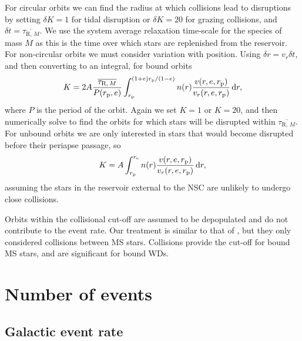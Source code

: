 For circular orbits we can find the radius at which collisions lead to disruptions by setting $\delta K = 1$ for tidal disruption or $\delta K = 20$ for grazing collisions, and $\delta t = \overline{\tau_{\mathrm{R},\,M}}$. We use the system average relaxation time-scale for the species of mass $M$ as this is the time over which stars are replenished from the reservoir. For non-circular orbits we must consider variation with position. Using $\delta r = v_r \delta t$, and then converting to an integral, for bound orbits
\begin{equation}
K = 2 A \dfrac{\overline{\tau_{\mathrm{R},\,M}}}{P(r_\mathrm{p},e)}\int_{r_\mathrm{p}}^{(1+e)r_\mathrm{p}/(1-e)}{n(r)\dfrac{v(r,e,r_\mathrm{p})}{v_r(r,e,r_\mathrm{p})}}\,\mathrm{d}{r},
\label{eq:collision-K}
\end{equation}
where $P$ is the period of the orbit. Again we set $K = 1$ or $K = 20$, and then numerically solve  to find the orbits for which stars will be disrupted within $\overline{\tau_{\mathrm{R},\,M}}$. For unbound orbits we are only interested in stars that would become disrupted before their periapse passage, so
\begin{equation}
K = A \int_{r_\mathrm{p}}^{r_\mathrm{c}}{n(r)\dfrac{v(r,e,r_\mathrm{p})}{v_r(r,e,r_\mathrm{p})}}\,\mathrm{d}{r},
\end{equation}
assuming the stars in the reservoir external to the NSC are unlikely to undergo close collisions.

Orbits within the collisional cut-off are assumed to be depopulated and do not contribute to the event rate. Our treatment is similar to that of \citet{Hopman2007}, but they only considered collisions between MS stars. Collisions provide the cut-off for bound MS stars, and are significant for bound WDs.

\section{Number of events}\label{sec:no-events}

\subsection{Galactic event rate}

